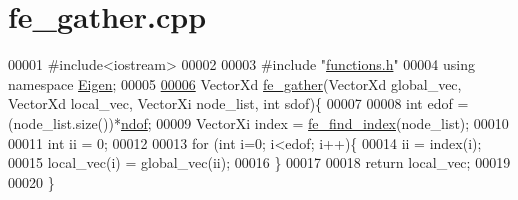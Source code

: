 \hypertarget{fe__gather_8cpp_source}{}\section{fe\+\_\+gather.\+cpp}
\label{fe__gather_8cpp_source}

\begin{DoxyCode}
00001 \textcolor{preprocessor}{#include<iostream>}
00002 
00003 \textcolor{preprocessor}{#include "\hyperlink{functions_8h}{functions.h}"}
00004 \textcolor{keyword}{using namespace }\hyperlink{namespace_eigen}{Eigen};
00005 
\hyperlink{fe__gather_8cpp_ab5053cb12ac67971a7836346e2839725}{00006} VectorXd \hyperlink{fe__gather_8cpp_ab5053cb12ac67971a7836346e2839725}{fe\_gather}(VectorXd global\_vec, VectorXd local\_vec, VectorXi node\_list, \textcolor{keywordtype}{int} sdof)\{
00007 
00008     \textcolor{keywordtype}{int} edof = (node\_list.size())*\hyperlink{_global_variables_8h_aa789fe4d8a13fd0990b630909430d5d0}{ndof};
00009     VectorXi index = \hyperlink{functions_8h_ae4dbe24b761cafa3577afab76726b382}{fe\_find\_index}(node\_list);
00010 
00011     \textcolor{keywordtype}{int} ii = 0;
00012 
00013     \textcolor{keywordflow}{for} (\textcolor{keywordtype}{int} i=0; i<edof; i++)\{
00014         ii = index(i);
00015         local\_vec(i) = global\_vec(ii);
00016     \}
00017 
00018     \textcolor{keywordflow}{return} local\_vec;
00019 
00020 \}
\end{DoxyCode}
